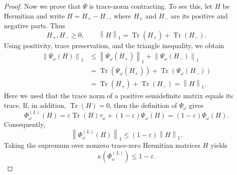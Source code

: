 \documentclass[a4paper]{article}
\numberwithin{equation}{section}   %
\theoremstyle{plain}   %
\theoremstyle{plain}   %
\theoremstyle{examplestyle}
\renewcommand{\tr}[1]{\operatorname{Tr}\left(#1\right)} %
\newcommand{\unorm}[1]{\left\lVert#1\right\rVert}
\begin{document}
\begin{proof}
        Now we prove that $\Psi$ is trace-norm contracting.
        To see this, let \(H\) be Hermitian and write \(H=H_+-H_-\), where \(H_+\) and \(H_-\) are its positive and negative parts. 
        Thus
        \[
            H_+,H_-\ge0,
            \qquad
            \unorm{H}_1=\tr{H_+}+\tr{H_-}.
        \]
        Using positivity, trace preservation, and the triangle inequality, we obtain
        \begin{align*}
            \unorm{\Psi_\omega(H)}_1
            &\le
            \unorm{\Psi_\omega(H_+)}_1
            +
            \unorm{\Psi_\omega(H_-)}_1\\
            &=
            \tr{\Psi_\omega(H_+)}
            +
            \tr{\Psi_\omega(H_-)}\\
            &=
            \tr{H_+}+\tr{H_-}
            =
            \unorm{H}_1.
        \end{align*}
        Here we used that the trace norm of a positive semidefinite matrix equals its trace.
        If, in addition, \(\tr{H}=0\), then the definition of \(\Psi_\omega\) gives
        \[
            \Phi^{(L)}_\omega(H)
            =
            \varepsilon\tr{H}\tau_\omega
            +(1-\varepsilon)\Psi_\omega(H)
            =
            (1-\varepsilon)\Psi_\omega(H).
        \]
        Consequently,
        \[
            \unorm{\Phi^{(L)}_\omega(H)}_1
            \le
            (1-\varepsilon)\unorm{H}_1.
        \]
        Taking the supremum over nonzero trace-zero Hermitian matrices
        \(H\) yields
        \[
            \kappa(\Phi^{(L)}_\omega)\le1-\varepsilon.
        \]


\end{proof}
\end{document}
